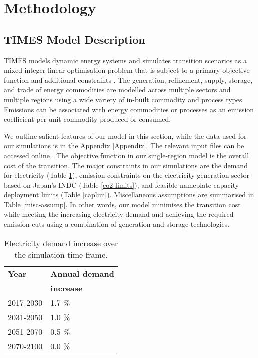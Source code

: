 \section{Methodology} \label{method}
\subsection{TIMES Model Description}
\gls{TIMES} models dynamic energy systems and simulates transition scenarios as a mixed-integer linear optimisation problem that is subject to a primary objective function and additional constraints \cite{loulou_etsap-tiam_2008}. The generation, refinement, supply, storage, and trade of energy commodities are modelled across multiple sectors and multiple regions using a wide variety of in-built commodity and process types. Emissions can be associated with energy commodities or processes as an emission coefficient per unit commodity produced or consumed. 

We outline salient features of our model in this section, while the data used for our simulations is in the Appendix \ref{Appendix}. The relevant input files can be accessed online \cite{chaube_arfci2cner_2021}. The objective function in our single-region model is the overall cost of the transition. The major constraints in our simulations are the demand for electricity (Table \ref{demand}), emission constraints on the electricity-generation sector based on Japan's \gls{INDC} (Table \ref{co2-limits}), and feasible nameplate capacity deployment limits (Table \ref{caplim}). Miscellaneous assumptions are summarised in Table \ref{misc-assump}. In other words, our model minimises the transition cost while meeting the increasing electricity demand and achieving the required emission cuts using a combination of generation and storage technologies. 

\begin{table}[H]
\centering
	\caption{Electricity demand increase over the simulation time frame.}
	\vspace{0.1in}
	\begin{tabularx}{0.4\textwidth}{p{} p{}}
		\hline
\textbf{Year} & \textbf{Annual demand} \\
 & \textbf{increase} \\
\hline
2017-2030 & 1.7 \% \cite{noauthor_electricity_2019} \\
2031-2050 & 1.0 \% \\
2051-2070 & 0.5 \% \\
2070-2100 & 0.0 \% \\
\hline 
	\end{tabularx}
\label{demand}
\end{table}

